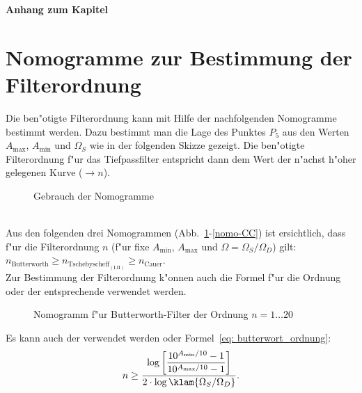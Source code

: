 
\clearpage
\setcounter{section}{0}
\renewcommand{\thesection}{\thechapter.\Alph{section}}
\vspace*{20pt}
{\LARGE\textbf{Anhang zum Kapitel~\thechapter}}
\section{Nomogramme zur Bestimmung der Filterordnung}
Die ben"otigte Filterordnung kann mit Hilfe der nachfolgenden
Nomogramme bestimmt werden.  Dazu bestimmt man die Lage des Punktes
$P_{5}$ aus den Werten $A_{\max}$, $A_{\min}$ und $\Omega_{S}$ wie in
der folgenden Skizze gezeigt.  Die ben"otigte Filterordnung f"ur das Tiefpassfilter entspricht
dann dem Wert der n"achst h"oher gelegenen Kurve ($\rightarrow n$).
\begin{figure}[!htb]
\begin{center}
  \caption{Gebrauch der Nomogramme}
\end{center}
\vspace*{-4mm}
\end{figure}\\
\nit Aus den folgenden drei Nomogrammen (Abb.~\ref{nomo-BW}-\ref{nomo-CC}) ist ersichtlich, dass f"ur die Filterordnung $n$ (f"ur fixe $A_{\min}$, $A_{\max}$ und $\Omega=\Omega_{S}/\Omega_{D}$) gilt: $n_{\text{Butterworth}}\geq n_{\text{Tschebyscheff}_{(\text{I,II})}}\geq n_{\text{Cauer}}$.\\
\nit Zur Bestimmung der Filterordnung k"onnen auch die Formel f"ur die Ordnung oder der entsprechende \mb verwendet werden.
\clearpage
\begin{figure}[!htb]%
\begin{center}\vspace*{-5.5mm}\hspace*{-5mm}
  \vspace*{-1.8cm}\caption{Nomogramm f"ur Butterworth-Filter der Ordnung $n=1\ldots 20$\label{nomo-BW}}
\end{center}
\end{figure}
\vspace*{-0.7cm}\nit Es kann auch der  verwendet werden oder Formel~\ref{eq: butterwort_ordnung}:
{\footnotesize\begin{equation*}
n \geq\frac{\log{\left[\displaystyle\frac{10^{A_{\min}/10}-1}
{10^{A_{\max}/10}-1}\right]}}
{2 \cdot \log{\klam{\Omega_S/\Omega_D}}}.
\end{equation*}}

